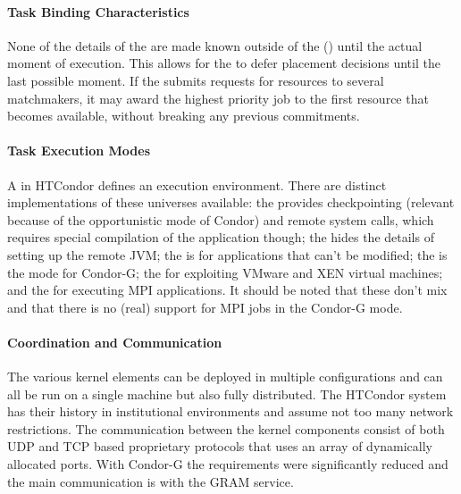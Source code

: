 \documentclass{sig-alternate}
\begin{document}
\paragraph{Task Binding Characteristics}


None of the details of the  are made known outside of the
 () until the actual moment of execution.
This allows for the  to defer placement decisions until the last
possible moment. If the  submits requests for resources to
several matchmakers, it may award the highest priority job to the first
resource that becomes available, without breaking any previous commitments.

\paragraph{Task Execution Modes}

A  in HTCondor defines an execution environment. There are
distinct implementations of these universes available: the  provides checkpointing (relevant because of the opportunistic mode of
Condor) and remote system calls, which requires special compilation of the
application though; the  hides the details of setting up
the remote JVM; the  is for applications that can't
be modified; the  is the mode for Condor-G; the
 for exploiting VMware and XEN virtual machines; and the
 for executing MPI applications. It should be noted
that these  don't mix and that there is no (real) support
for MPI jobs in the Condor-G mode.

\paragraph{Coordination and Communication}

The various kernel elements can be deployed in multiple configurations and can
all be run on a single machine but also fully distributed. The HTCondor system
has their history in institutional environments and assume not too many network
restrictions. The
communication between the kernel components consist of both UDP and TCP based
proprietary protocols that uses an array of dynamically allocated ports. With
Condor-G the requirements were significantly reduced and the main communication
is with the GRAM service.
\end{document}
